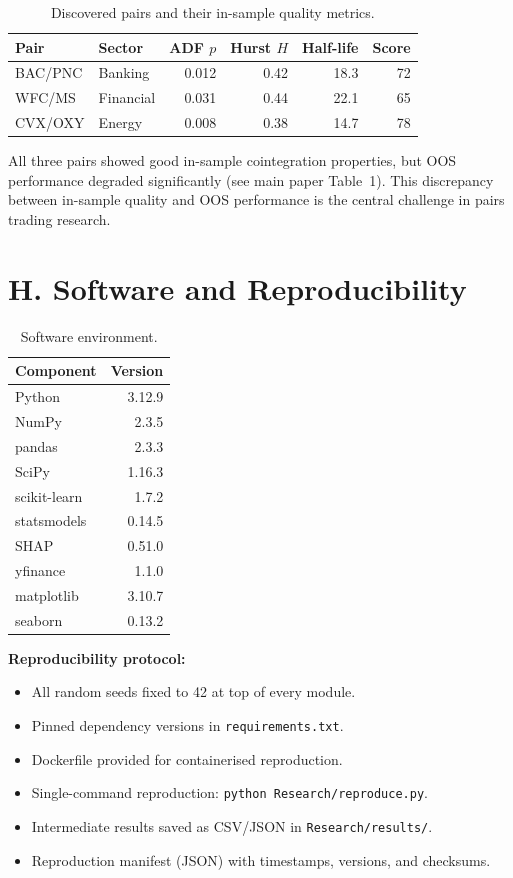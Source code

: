 \documentclass[conference]{IEEEtran}
\begin{document}
\begin{table}[h]
\centering
\caption{Discovered pairs and their in-sample quality metrics.}
\label{tab:supp_pairs}
\small
\begin{tabular}{llrrrr}
\toprule
Pair & Sector & ADF $p$ & Hurst $H$ & Half-life & Score \\
\midrule
BAC/PNC & Banking & 0.012 & 0.42 & 18.3 & 72 \\
WFC/MS & Financial & 0.031 & 0.44 & 22.1 & 65 \\
CVX/OXY & Energy & 0.008 & 0.38 & 14.7 & 78 \\
\bottomrule
\end{tabular}
\end{table}

All three pairs showed good in-sample cointegration properties, but
OOS performance degraded significantly (see main paper Table~1).
This discrepancy between in-sample quality and OOS performance is the
central challenge in pairs trading research.

\section{H. Software and Reproducibility}
\label{sec:software}

\begin{table}[h]
\centering
\caption{Software environment.}
\label{tab:supp_software}
\small
\begin{tabular}{lr}
\toprule
Component & Version \\
\midrule
Python & 3.12.9 \\
NumPy & 2.3.5 \\
pandas & 2.3.3 \\
SciPy & 1.16.3 \\
scikit-learn & 1.7.2 \\
statsmodels & 0.14.5 \\
SHAP & 0.51.0 \\
yfinance & 1.1.0 \\
matplotlib & 3.10.7 \\
seaborn & 0.13.2 \\
\bottomrule
\end{tabular}
\end{table}

\textbf{Reproducibility protocol:}
\begin{itemize}
    \item All random seeds fixed to 42 at top of every module.
    \item Pinned dependency versions in \texttt{requirements.txt}.
    \item Dockerfile provided for containerised reproduction.
    \item Single-command reproduction: \texttt{python Research/reproduce.py}.
    \item Intermediate results saved as CSV/JSON in \texttt{Research/results/}.
    \item Reproduction manifest (JSON) with timestamps, versions, and checksums.
\end{itemize}
\end{document}
